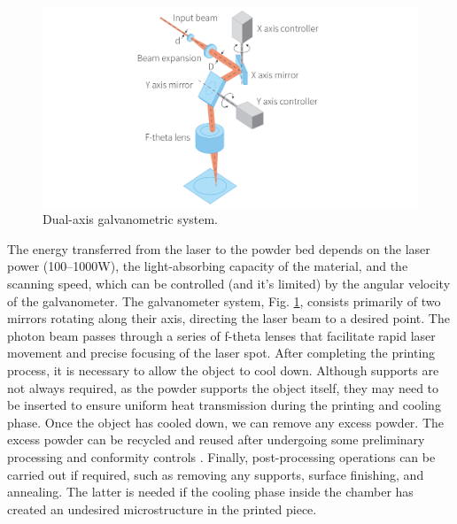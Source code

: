 \begin{figure}
    \centering
    \includegraphics[scale=0.4]{Images/galvanometro.png}
    \caption[Galvanometric system.]{Dual-axis galvanometric system.}
    \label{fig:galvano}
\end{figure}
The energy transferred from the laser to the powder bed depends on the laser power (\numrange[range-phrase = --]{100}{1000}\unit{\watt}), the light-absorbing capacity of the material, and the scanning speed, which can be controlled (and it's limited) by the angular velocity of the galvanometer. The galvanometer system, Fig. \ref{fig:galvano}, consists primarily of two mirrors rotating along their axis, directing the laser beam to a desired point. The photon beam passes through a series of f-theta lenses that facilitate rapid laser movement and precise focusing of the laser spot. After completing the printing process, it is necessary to allow the object to cool down. Although supports are not always required, as the powder supports the object itself, they may need to be inserted to ensure uniform heat transmission during the printing and cooling phase. Once the object has cooled down, we can remove any excess powder. The excess powder can be recycled and reused after undergoing some preliminary processing and conformity controls \cite{strondl_characterization_2015}. Finally, post-processing operations can be carried out if required, such as removing any supports, surface finishing, and annealing. The latter is needed if the cooling phase inside the chamber has created an undesired microstructure in the printed piece.


